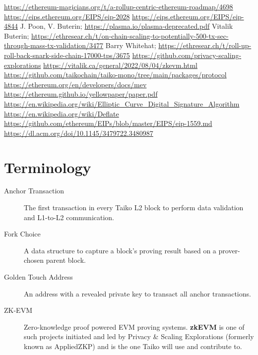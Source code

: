 \documentclass[9pt,oneside]{amsart}
\begin{document}
\begin{thebibliography}{9}
\url{https://ethereum-magicians.org/t/a-rollup-centric-ethereum-roadmap/4698}
\url{https://eips.ethereum.org/EIPS/eip-2028}
\url{https://eips.ethereum.org/EIPS/eip-4844}
J. Poon, V. Buterin; \url{https://plasma.io/plasma-deprecated.pdf}
Vitalik Buterin; \url{https://ethresear.ch/t/on-chain-scaling-to-potentially-500-tx-sec-through-mass-tx-validation/3477}
Barry Whitehat; \url{https://ethresear.ch/t/roll-up-roll-back-snark-side-chain-17000-tps/3675}
\url{https://github.com/privacy-scaling-explorations}
\url{https://vitalik.ca/general/2022/08/04/zkevm.html}
\url{https://github.com/taikochain/taiko-mono/tree/main/packages/protocol}
\url{https://ethereum.org/en/developers/docs/mev}
\url{https://ethereum.github.io/yellowpaper/paper.pdf}
\url{https://en.wikipedia.org/wiki/Elliptic_Curve_Digital_Signature_Algorithm}
\url{https://en.wikipedia.org/wiki/Deflate}
\url{https://github.com/ethereum/EIPs/blob/master/EIPS/eip-1559.md}
\url{https://dl.acm.org/doi/10.1145/3479722.3480987}

\end{thebibliography}

\appendix

\section{Terminology} \label{ch:Terminology}

\begin{description}
\item[Anchor Transaction] The first transaction in every Taiko L2 block to perform data validation and L1-to-L2 communication.


\item[Fork Choice] A data structure to capture a block's proving result based on a prover-chosen parent block.

\item[Golden Touch Address] An address with a revealed private key to transact all anchor transactions.

\item[ZK-EVM] Zero-knowledge proof powered EVM proving systems. \textbf{zkEVM} is one of such projects initiated and led by 
Privacy \& Scaling Explorations (formerly known as AppliedZKP)\cite{pse} and is the one Taiko will use and contribute to.
\end{description}
\end{document}
